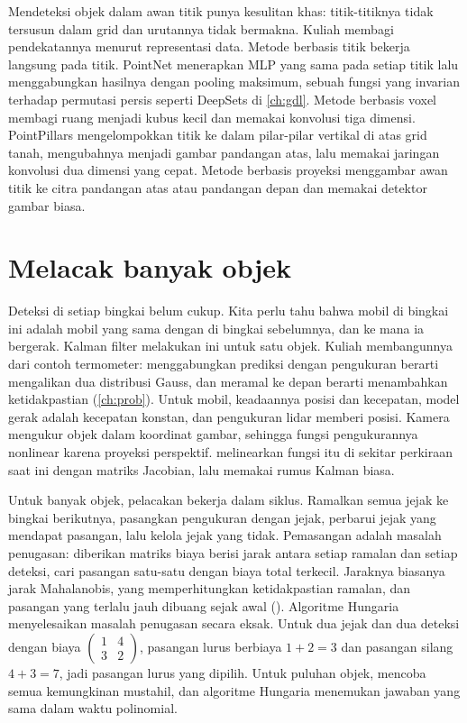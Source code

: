 Mendeteksi objek dalam awan titik punya kesulitan khas: titik-titiknya tidak tersusun dalam grid dan urutannya tidak
bermakna. Kuliah membagi pendekatannya menurut representasi data. Metode berbasis titik bekerja langsung pada titik.
PointNet \citep{qi2017} menerapkan MLP yang sama pada setiap titik lalu menggabungkan hasilnya dengan pooling maksimum,
sebuah fungsi yang invarian terhadap permutasi persis seperti DeepSets di \cref{ch:gdl}. Metode berbasis voxel membagi
ruang menjadi kubus kecil dan memakai konvolusi tiga dimensi. PointPillars \citep{lang2019} mengelompokkan titik ke dalam
pilar-pilar vertikal di atas grid tanah, mengubahnya menjadi gambar pandangan atas, lalu memakai jaringan konvolusi
dua dimensi yang cepat. Metode berbasis proyeksi menggambar awan titik ke citra pandangan atas atau pandangan depan dan
memakai detektor gambar biasa.

\section{Melacak banyak objek}

Deteksi di setiap bingkai belum cukup. Kita perlu tahu bahwa mobil di bingkai ini adalah mobil yang sama dengan di
bingkai sebelumnya, dan ke mana ia bergerak. Kalman filter melakukan ini untuk satu objek. Kuliah membangunnya dari
contoh termometer: menggabungkan prediksi dengan pengukuran berarti mengalikan dua distribusi Gauss, dan meramal ke
depan berarti menambahkan ketidakpastian (\cref{ch:prob}). Untuk mobil, keadaannya posisi dan kecepatan, model gerak
adalah kecepatan konstan, dan pengukuran lidar memberi posisi. Kamera mengukur objek dalam koordinat gambar, sehingga
fungsi pengukurannya nonlinear karena proyeksi perspektif.  melinearkan fungsi itu di
sekitar perkiraan saat ini dengan matriks Jacobian, lalu memakai rumus Kalman biasa.

Untuk banyak objek, pelacakan bekerja dalam siklus. Ramalkan semua jejak ke bingkai berikutnya, pasangkan
pengukuran dengan jejak, perbarui jejak yang mendapat pasangan, lalu kelola jejak yang tidak. Pemasangan adalah masalah
penugasan: diberikan matriks biaya berisi jarak antara setiap ramalan dan setiap deteksi, cari pasangan satu-satu dengan
biaya total terkecil. Jaraknya biasanya jarak Mahalanobis, yang memperhitungkan ketidakpastian ramalan, dan pasangan
yang terlalu jauh dibuang sejak awal (). Algoritme Hungaria \citep{kuhn1955} menyelesaikan masalah
penugasan secara eksak. Untuk dua jejak dan dua deteksi dengan biaya $\begin{pmatrix}1&4\\3&2\end{pmatrix}$, pasangan
lurus berbiaya $1+2=3$ dan pasangan silang $4+3=7$, jadi pasangan lurus yang dipilih. Untuk puluhan objek, mencoba semua
kemungkinan mustahil, dan algoritme Hungaria menemukan jawaban yang sama dalam waktu polinomial.

